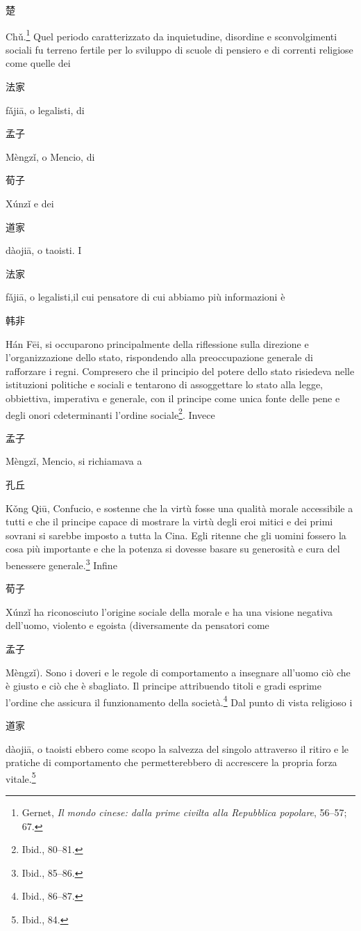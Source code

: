\documentclass[12pt,titlepage]{article}
\begin{document}
\begin{CJK*}{UTF8}{gbsn}楚 \end{CJK*}Chǔ.\footnote{Gernet, \emph{Il mondo cinese: dalla prime civilta alla Repubblica popolare}, 56–57; 67.}
Quel periodo caratterizzato da inquietudine, disordine e sconvolgimenti sociali fu terreno fertile per lo sviluppo di scuole di pensiero e di correnti religiose come quelle dei 
\begin{CJK*}{UTF8}{gbsn} 法家\end{CJK*} fǎjiā, o legalisti, di 
\begin{CJK*}{UTF8}{gbsn}孟子\end{CJK*} Mèngzǐ, o Mencio, di
\begin{CJK*}{UTF8}{gbsn} 荀子 \end{CJK*}Xúnzǐ e dei\begin{CJK*}{UTF8}{gbsn}道家 \end{CJK*}dàojiā, o taoisti.
I
\begin{CJK*}{UTF8}{gbsn}法家 \end{CJK*}fǎjiā, o legalisti,il cui pensatore di cui abbiamo più informazioni è \begin{CJK*}{UTF8}{gbsn}韩非 \end{CJK*}Hán Fēi, si occuparono principalmente della riflessione sulla direzione e l'organizzazione dello stato, rispondendo alla preoccupazione generale di rafforzare i regni. Compresero che il principio del potere dello stato risiedeva nelle istituzioni politiche e sociali e tentarono di assoggettare lo stato alla legge, obbiettiva, imperativa e generale, con il principe come unica fonte delle pene e degli onori cdeterminanti l'ordine sociale\footnote{Ibid., 80–81.}.
Invece 
\begin{CJK*}{UTF8}{gbsn}孟子 \end{CJK*}Mèngzǐ, Mencio, si richiamava a 
\begin{CJK*}{UTF8}{gbsn}孔丘 \end{CJK*}Kǒng Qiū, Confucio, e sostenne che la virtù fosse una qualità morale accessibile a tutti e che il principe capace di mostrare la virtù degli eroi mitici e dei primi sovrani si sarebbe imposto a tutta la Cina. Egli ritenne che gli uomini fossero la cosa più importante e che la potenza si dovesse basare su generosità e cura del benessere generale.\footnote{Ibid., 85–86.}
Infine \begin{CJK*}{UTF8}{gbsn}荀子 \end{CJK*}Xúnzǐ ha riconosciuto l'origine sociale della morale e ha una visione negativa dell'uomo, violento e egoista (diversamente da pensatori come 
\begin{CJK*}{UTF8}{gbsn}孟子 \end{CJK*}Mèngzǐ). Sono i doveri e le regole di comportamento a insegnare all'uomo ciò che è giusto e ciò che è sbagliato. Il principe attribuendo titoli e gradi esprime l'ordine che assicura il funzionamento della società.\footnote{Ibid., 86–87.}
Dal punto di vista religioso i 
\begin{CJK*}{UTF8}{gbsn}道家\end{CJK*} dàojiā, o taoisti ebbero come scopo la salvezza del singolo attraverso il ritiro e le pratiche di comportamento che permetterebbero di accrescere la propria forza vitale.\footnote{Ibid., 84.}
\end{document}
